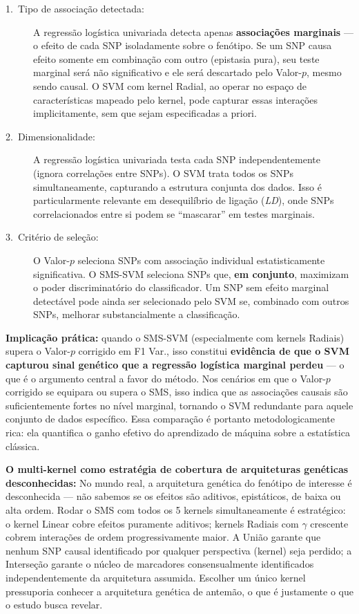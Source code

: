 \documentclass[
    12pt,
    a4paper,
    oneside,
    english,
    french,
    spanish,
    brazil
    ]{abntex2}
\newcommand{\novo}[1]{\textcolor{corNova}{#1}}
\begin{document}
\begin{description}
  \item[\novo{1.\ Tipo de associação detectada:}]
  \novo{A regressão logística univariada detecta apenas \textbf{associações marginais} --- o efeito de cada SNP isoladamente sobre o fenótipo. Se um SNP causa efeito somente em combinação com outro (epistasia pura), seu teste marginal será não significativo e ele será descartado pelo Valor-$p$, mesmo sendo causal. O SVM com kernel Radial, ao operar no espaço de características mapeado pelo kernel, pode capturar essas interações implicitamente, sem que sejam especificadas a priori.}

  \item[\novo{2.\ Dimensionalidade:}]
  \novo{A regressão logística univariada testa cada SNP independentemente (ignora correlações entre SNPs). O SVM trata todos os SNPs simultaneamente, capturando a estrutura conjunta dos dados. Isso é particularmente relevante em desequilíbrio de ligação (\textit{LD}), onde SNPs correlacionados entre si podem se ``mascarar'' em testes marginais.}

  \item[\novo{3.\ Critério de seleção:}]
  \novo{O Valor-$p$ seleciona SNPs com associação individual estatisticamente significativa. O SMS-SVM seleciona SNPs que, \textbf{em conjunto}, maximizam o poder discriminatório do classificador. Um SNP sem efeito marginal detectável pode ainda ser selecionado pelo SVM se, combinado com outros SNPs, melhorar substancialmente a classificação.}
\end{description}

\novo{\textbf{Implicação prática:} quando o SMS-SVM (especialmente com kernels Radiais) supera o Valor-$p$ corrigido em F1 Var., isso constitui \textbf{evidência de que o SVM capturou sinal genético que a regressão logística marginal perdeu} --- o que é o argumento central a favor do método. Nos cenários em que o Valor-$p$ corrigido se equipara ou supera o SMS, isso indica que as associações causais são suficientemente fortes no nível marginal, tornando o SVM redundante para aquele conjunto de dados específico. Essa comparação é portanto metodologicamente rica: ela quantifica o ganho efetivo do aprendizado de máquina sobre a estatística clássica.}

\novo{\textbf{O multi-kernel como estratégia de cobertura de arquiteturas genéticas desconhecidas:} No mundo real, a arquitetura genética do fenótipo de interesse é desconhecida --- não sabemos se os efeitos são aditivos, epistáticos, de baixa ou alta ordem. Rodar o SMS com todos os 5 kernels simultaneamente é estratégico: o kernel Linear cobre efeitos puramente aditivos; kernels Radiais com $\gamma$ crescente cobrem interações de ordem progressivamente maior. A União garante que nenhum SNP causal identificado por qualquer perspectiva (kernel) seja perdido; a Interseção garante o núcleo de marcadores consensualmente identificados independentemente da arquitetura assumida. Escolher um único kernel pressuporia conhecer a arquitetura genética de antemão, o que é justamente o que o estudo busca revelar.}
\end{document}
